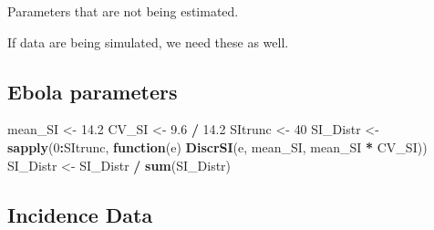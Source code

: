 \documentclass[11pt,]{article}
\newenvironment{Shaded}{\begin{snugshade}}{\end{snugshade}}
\newcommand{\KeywordTok}[1]{\textcolor[rgb]{0.13,0.29,0.53}{\textbf{#1}}}
\newcommand{\DecValTok}[1]{\textcolor[rgb]{0.00,0.00,0.81}{#1}}
\newcommand{\FloatTok}[1]{\textcolor[rgb]{0.00,0.00,0.81}{#1}}
\newcommand{\StringTok}[1]{\textcolor[rgb]{0.31,0.60,0.02}{#1}}
\newcommand{\ControlFlowTok}[1]{\textcolor[rgb]{0.13,0.29,0.53}{\textbf{#1}}}
\newcommand{\OperatorTok}[1]{\textcolor[rgb]{0.81,0.36,0.00}{\textbf{#1}}}
\newcommand{\NormalTok}[1]{#1}
\begin{document}
Parameters that are not being estimated.

\begin{Shaded}
\end{Shaded}

If data are being simulated, we need these as well.

\begin{Shaded}
\end{Shaded}

\subsection{Ebola parameters}\label{ebola-parameters}

\begin{Shaded}
\begin{Highlighting}[]
\NormalTok{mean_SI  <-}\StringTok{ }\FloatTok{14.2}
\NormalTok{CV_SI    <-}\StringTok{ }\FloatTok{9.6} \OperatorTok{/}\StringTok{ }\FloatTok{14.2}
\NormalTok{SItrunc  <-}\StringTok{ }\DecValTok{40}
\NormalTok{SI_Distr <-}\StringTok{ }\KeywordTok{sapply}\NormalTok{(}\DecValTok{0}\OperatorTok{:}\NormalTok{SItrunc,}
                   \ControlFlowTok{function}\NormalTok{(e) }\KeywordTok{DiscrSI}\NormalTok{(e,}
\NormalTok{                                       mean_SI,}
\NormalTok{                                       mean_SI }\OperatorTok{*}\StringTok{ }\NormalTok{CV_SI))}
\NormalTok{SI_Distr <-}\StringTok{ }\NormalTok{SI_Distr }\OperatorTok{/}\StringTok{ }\KeywordTok{sum}\NormalTok{(SI_Distr)}
\end{Highlighting}
\end{Shaded}

\subsection{Incidence Data}\label{incidence-data}
\end{document}

